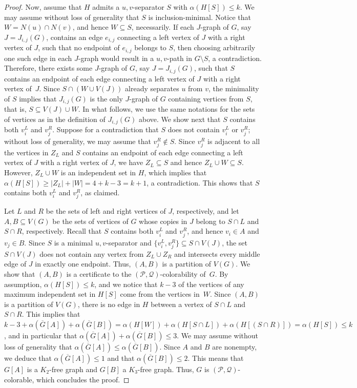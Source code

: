 \documentclass[11pt]{article}
\theoremstyle{definition}
\begin{document}
\begin{proof}
Now, assume that $H$ admits a $u{,}v$-separator $S$ with $\alpha(H[S]) \leq k$.
We may assume without loss of generality that $S$ is inclusion-minimal.
Notice that $W = N(u) \cap N(v)$, and hence $W \subseteq S$, necessarily.
If each $J$-graph of $G$, say $J = J_{i,j}(G)$, contains an edge $e_{i,j}$ connecting a left vertex of $J$ with a right vertex of $J$, such that no endpoint of $e_{i,j}$ belongs to $S$, then choosing arbitrarily one such edge in each $J$-graph would result in a $u{,}v$-path in $G\setminus S$, a contradiction.
Therefore, there exists some $J$-graph of $G$, say $J = J_{i,j}(G)$, such that $S$ contains an endpoint of each edge connecting a left vertex of $J$ with a right vertex of~$J$.
Since $S\cap (W\cup V(J))$ already separates $u$ from $v$, the minimality of $S$ implies that $J_{i,j}(G)$ is the only $J$-graph of $G$ containing vertices from $S$, that is, $S \subseteq V(J)\cup W$.
In what follows, we use the same notations for the sets of vertices as in the definition of $J_{i,j}(G)$ above.
We show next that $S$ contains both $v_i^L$ and $v_j^R$.
Suppose for a contradiction that $S$ does not contain $v_i^L$ or $v_j^R$; without loss of generality, we may assume that $v_j^R \notin S$.
Since $v_j^R$ is adjacent to all the vertices in $Z_L$ and $S$ contains an endpoint of each edge connecting a left vertex of $J$ with a right vertex of $J$, we have $Z_L \subseteq S$ and hence
$Z_L \cup W\subseteq S$.
However, $Z_L \cup W$ is an independent set in $H$, which implies that $\alpha(H[S]) \geq |Z_L|+|W| = 4 + k-3 = k+1$, a contradiction.
This shows that $S$ contains both $v_i^L$ and $v_j^R$, as claimed.

Let $L$ and $R$ be the sets of left and right vertices of $J$, respectively, and let $A,B\subseteq V(G)$ be the sets of vertices of $G$ whose copies in $J$ belong to $S \cap L$ and $S \cap R$, respectively.
Recall that $S$ contains both $v_i^L$ and $v_j^R$, and hence $v_i \in A$ and $v_j \in B$.
Since $S$ is a minimal \hbox{$u{,}v$-separator} and $\{v_i^L,v_j^R\}\subseteq S\cap V(J)$, the set $S\cap V(J)$ does not contain any vertex from $Z_L\cup Z_R$ and intersects every middle edge of $J$ in exactly one endpoint.
Thus, $(A,B)$ is a partition of $V(G)$.
We show that $(A,B)$ is a certificate to the $(\mathcal{P},\mathcal{Q})$-colorability of~$G$.
By assumption, $\alpha(H[S]) \leq k$, and we notice that $k-3$ of the vertices of any maximum independent set in $H[S]$ come from the vertices in~$W$.
Since $(A,B)$ is a partition of $V(G)$, there is no edge in $H$ between a vertex of $S \cap L$ and $S \cap R$.
This implies that $k-3 + \alpha(\overline{G}[A]) + \alpha(\overline{G}[B]) =\alpha(H[W]) + \alpha(H[S \cap L]) + \alpha(H[(S \cap R)]) = \alpha(H[S])\leq k$, and in particular that $\alpha(\overline{G}[A]) + \alpha(\overline{G}[B]) \leq 3$.
We may assume without loss of generality that
$\alpha(\overline{G}[A]) \leq \alpha(\overline{G}[B])$.
Since $A$ and $B$ are nonempty, we deduce that $\alpha(\overline{G}[A]) \leq 1$ and that $\alpha(\overline{G}[B]) \leq 2$.
This means that $G[A]$ is a $K_2$-free graph and $G[B]$ a $K_3$-free graph.
Thus, $G$ is $(\mathcal{P},\mathcal{Q})$-colorable, which concludes the proof.
\end{proof}
\end{document}
